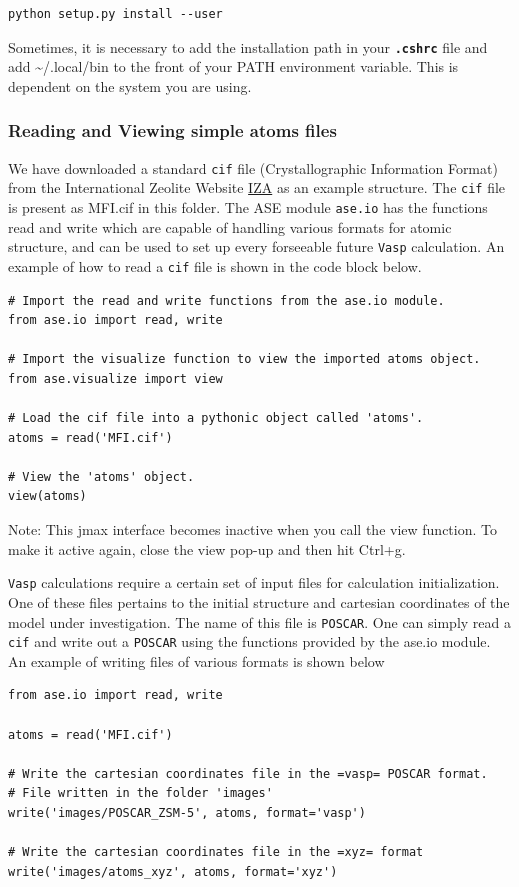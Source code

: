 \documentclass[11pt]{article}
\begin{document}
\begin{verbatim}
python setup.py install --user
\end{verbatim}

Sometimes, it is necessary to add the installation path in your \textbf{\texttt{.cshrc}} file and add \textasciitilde{}/.local/bin to the front of your PATH environment variable. This is dependent on the system you are using. 

\subsubsection{Reading and Viewing simple atoms files}
\label{sec-2-3-2}
We have downloaded a standard \texttt{cif} file (Crystallographic Information Format) from the International Zeolite Website \href{http://www.iza-online.org/}{IZA} as an example structure. The \texttt{cif} file is present as MFI.cif in this folder. 
The ASE module \texttt{ase.io} has the functions read and write which are capable of handling various formats for atomic structure, and can be used to set up every forseeable future \texttt{Vasp} calculation. An example of how to read a \texttt{cif} file is shown in the code block below.

\begin{verbatim}
# Import the read and write functions from the ase.io module.
from ase.io import read, write

# Import the visualize function to view the imported atoms object.
from ase.visualize import view

# Load the cif file into a pythonic object called 'atoms'.
atoms = read('MFI.cif')

# View the 'atoms' object.
view(atoms)
\end{verbatim}

Note: This jmax interface becomes inactive when you call the view function. To make it active again, close the view pop-up and then hit Ctrl+g.

\texttt{Vasp} calculations require a certain set of input files for calculation initialization. One of these files pertains to the initial structure and cartesian coordinates of the model under investigation. The name of this file is \texttt{POSCAR}. One can simply read a \texttt{cif} and write out a \texttt{POSCAR} using the functions provided by the ase.io module. An example of writing files of various formats is shown below

\begin{verbatim}
from ase.io import read, write

atoms = read('MFI.cif')

# Write the cartesian coordinates file in the =vasp= POSCAR format.
# File written in the folder 'images'
write('images/POSCAR_ZSM-5', atoms, format='vasp')

# Write the cartesian coordinates file in the =xyz= format
write('images/atoms_xyz', atoms, format='xyz')
\end{verbatim}
\end{document}
